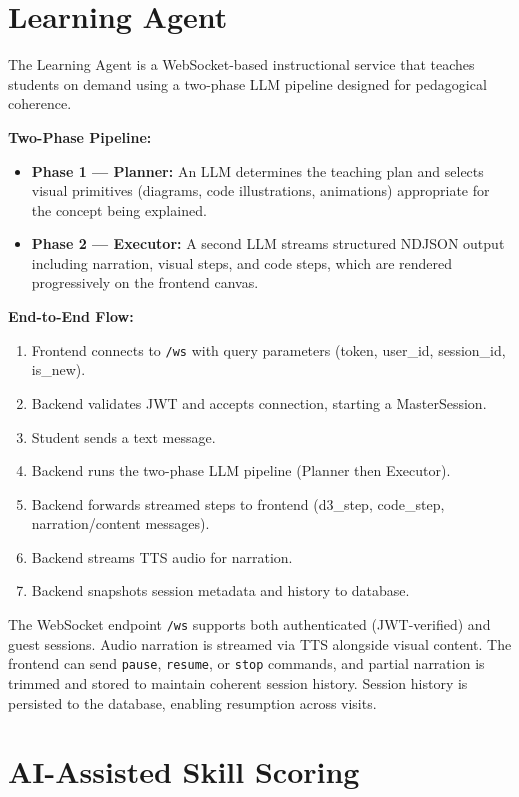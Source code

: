 \documentclass[12pt,a4paper]{report}
\begin{document}
\section{Learning Agent}

The Learning Agent is a WebSocket-based instructional service that teaches students on demand using a two-phase LLM pipeline designed for pedagogical coherence.

\noindent\textbf{Two-Phase Pipeline:}
\begin{itemize}
    \item \textbf{Phase 1 --- Planner:} An LLM determines the teaching plan and selects visual primitives (diagrams, code illustrations, animations) appropriate for the concept being explained.
    \item \textbf{Phase 2 --- Executor:} A second LLM streams structured NDJSON output including narration, visual steps, and code steps, which are rendered progressively on the frontend canvas.
\end{itemize}

\noindent\textbf{End-to-End Flow:}
\begin{enumerate}
    \item Frontend connects to \texttt{/ws} with query parameters (token, user\_id, session\_id, is\_new).
    \item Backend validates JWT and accepts connection, starting a MasterSession.
    \item Student sends a text message.
    \item Backend runs the two-phase LLM pipeline (Planner then Executor).
    \item Backend forwards streamed steps to frontend (d3\_step, code\_step, narration/content messages).
    \item Backend streams TTS audio for narration.
    \item Backend snapshots session metadata and history to database.
\end{enumerate}

The WebSocket endpoint \texttt{/ws} supports both authenticated (JWT-verified) and guest sessions. Audio narration is streamed via TTS alongside visual content. The frontend can send \texttt{pause}, \texttt{resume}, or \texttt{stop} commands, and partial narration is trimmed and stored to maintain coherent session history. Session history is persisted to the database, enabling resumption across visits.

\section{AI-Assisted Skill Scoring}
\end{document}
